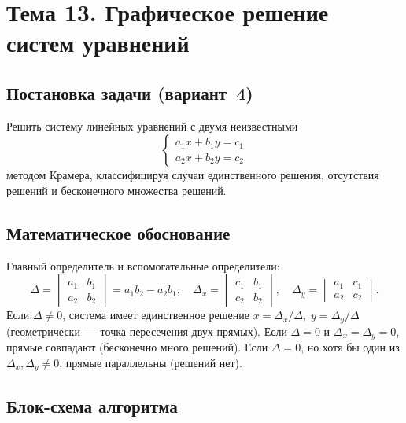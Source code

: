 \section{Тема 13. Графическое решение систем уравнений}

\subsection{Постановка задачи (вариант~4)}

Решить систему линейных уравнений с двумя неизвестными
\[
  \begin{cases} a_1x+b_1y=c_1\\ a_2x+b_2y=c_2 \end{cases}
\]
методом Крамера, классифицируя случаи единственного решения,
отсутствия решений и бесконечного множества решений.

\subsection{Математическое обоснование}

Главный определитель и вспомогательные определители:
\[
  \Delta = \begin{vmatrix}a_1&b_1\\a_2&b_2\end{vmatrix} = a_1b_2-a_2b_1,\quad
  \Delta_x = \begin{vmatrix}c_1&b_1\\c_2&b_2\end{vmatrix},\quad
  \Delta_y = \begin{vmatrix}a_1&c_1\\a_2&c_2\end{vmatrix}.
\]
Если $\Delta \ne 0$, система имеет единственное решение
$x=\Delta_x/\Delta,\;y=\Delta_y/\Delta$ (геометрически~--- точка
пересечения двух прямых). Если $\Delta=0$ и $\Delta_x=\Delta_y=0$,
прямые совпадают (бесконечно много решений). Если $\Delta=0$,
но хотя бы один из $\Delta_x,\Delta_y \ne 0$, прямые параллельны
(решений нет).

\subsection{Блок-схема алгоритма}

